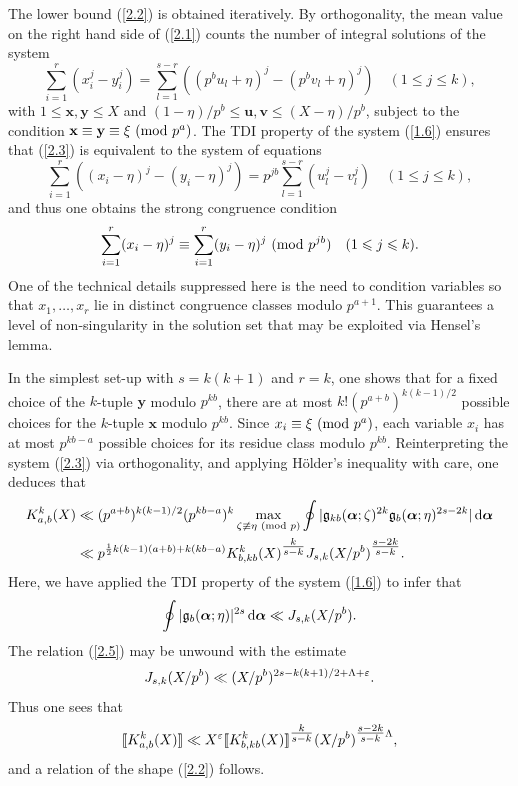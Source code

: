 \documentclass[12pt,reqno]{amsart}
\theoremstyle{definition}
\theoremstyle{remark}
\numberwithin{equation}{section}
\newcommand{\mmod}[1]{\,\,(\text{\rm mod}\,\,#1)}
\def\bfu{{\mathbf u}}
\def\bfv{{\mathbf v}}
\def\bfx{{\mathbf x}}
\def\bfy{{\mathbf y}}
\def\grg{{\mathfrak g}}\def\grG{{\mathfrak G}}
\def\eps{\varepsilon}
\def\le{\leqslant} \def\ge{\geqslant} \def\pleq{\preccurlyeq} \def\ple{\prec}
\def\d{{\,{\rm d}}}
\begin{document}
The lower bound (\ref{2.2}) is obtained iteratively. By orthogonality, the mean value on the 
right hand side of (\ref{2.1}) counts the number of integral solutions of the system
\begin{equation}\label{2.3}
\sum_{i=1}^r(x_i^j-y_i^j)=\sum_{l=1}^{s-r}
\left( (p^bu_l+\eta)^j-(p^bv_l+\eta)^j\right) \quad (1\le j\le k),
\end{equation}
with $1\le \bfx,\bfy\le X$ and $(1-\eta)/p^b\le \bfu,\bfv\le (X-\eta)/p^b$, subject to the 
condition $\bfx\equiv \bfy\equiv \xi\mmod{p^a}$. The TDI property of the system 
(\ref{1.6}) ensures that (\ref{2.3}) is equivalent to the system of equations
$$\sum_{i=1}^r\left( (x_i-\eta)^j-(y_i-\eta)^j\right)=p^{jb}\sum_{l=1}^{s-r}
\left( u_l^j-v_l^j\right) \quad (1\le j\le k),$$
and thus one obtains the strong congruence condition
\begin{equation}\label{2.4}
\sum_{i=1}^r(x_i-\eta)^j\equiv \sum_{i=1}^r(y_i-\eta)^j\mmod{p^{jb}}\quad 
(1\le j\le k).
\end{equation}
One of the technical details suppressed here is the need to condition variables so that 
$x_1,\ldots ,x_r$ lie in distinct congruence classes modulo $p^{a+1}$. This guarantees 
a level of non-singularity in the solution set that may be exploited via Hensel's lemma.\par

In the simplest set-up with $s=k(k+1)$ and $r=k$, one shows that for a fixed choice of the 
$k$-tuple $\bfy$ modulo $p^{kb}$, there are at most $k!(p^{a+b})^{k(k-1)/2}$ possible 
choices for the $k$-tuple $\bfx$ modulo $p^{kb}$. Since $x_i\equiv \xi\mmod{p^a}$, each 
variable $x_i$ has at most $p^{kb-a}$ possible choices for its residue class modulo 
$p^{kb}$. Reinterpreting the system (\ref{2.3}) via orthogonality, and applying H\"older's 
inequality with care, one deduces that
\begin{align}
K_{a,b}^k(X)&\ll (p^{a+b})^{k(k-1)/2}(p^{kb-a})^k
\max_{\zeta\not\equiv \eta\mmod{p}}\oint |\grg_{kb}(\bfalp;\zeta)^{2k}
\grg_b(\bfalp;\eta)^{2s-2k}|\d\bfalp \notag\\
&\ll p^{\frac{1}{2}k(k-1)(a+b)+k(kb-a)}K_{b,kb}^k(X)^{\tfrac{k}{s-k}}
J_{s,k}(X/p^b)^{\tfrac{s-2k}{s-k}}.\label{2.5}
\end{align}
Here, we have applied the TDI property of the system (\ref{1.6}) to infer that
$$\oint |\grg_b(\bfalp;\eta)|^{2s}\d\bfalp \ll J_{s,k}(X/p^b).$$
The relation (\ref{2.5}) may be unwound with the estimate
$$J_{s,k}(X/p^b)\ll (X/p^b)^{2s-k(k+1)/2+\Lam+\eps}.$$
Thus one sees that
\begin{equation}\label{2.6}
\llbracket K_{a,b}^k(X)\rrbracket \ll X^\eps \llbracket K_{b,kb}^k(X)
\rrbracket ^{\tfrac{k}{s-k}}(X/p^b)^{\tfrac{s-2k}{s-k}\Lam},
\end{equation}
and a relation of the shape (\ref{2.2}) follows.\par
\end{document}

